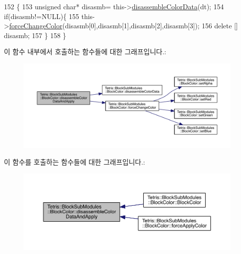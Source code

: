 \begin{DoxyCode}
152                                                               \{
153                 \textcolor{keywordtype}{unsigned} \textcolor{keywordtype}{char}* disasmb= this->\hyperlink{class_tetris_1_1_block_sub_modules_1_1_block_color_a216ddc10773f9d0dc44eca5b8b3d8336}{disassembleColorData}(dt);
154                 \textcolor{keywordflow}{if}(disasmb!=NULL)\{
155                     this->\hyperlink{class_tetris_1_1_block_sub_modules_1_1_block_color_ae6d640629b11d880ca994923657adbe1}{forceChangeColor}(disasmb[0],disasmb[1],disasmb[2],disasmb[3]);
156                     \textcolor{keyword}{delete} [] disasmb;
157                 \}
158             \}
\end{DoxyCode}
이 함수 내부에서 호출하는 함수들에 대한 그래프입니다.\+:
\nopagebreak
\begin{figure}[H]
\begin{center}
\leavevmode
\includegraphics[width=350pt]{de/d44/class_tetris_1_1_block_sub_modules_1_1_block_color_afc3bb979353c91cf992101ed2dde610f_cgraph}
\end{center}
\end{figure}
이 함수를 호출하는 함수들에 대한 그래프입니다.\+:
\nopagebreak
\begin{figure}[H]
\begin{center}
\leavevmode
\includegraphics[width=350pt]{de/d44/class_tetris_1_1_block_sub_modules_1_1_block_color_afc3bb979353c91cf992101ed2dde610f_icgraph}
\end{center}
\end{figure}
\mbox{\label{class_tetris_1_1_block_sub_modules_1_1_block_color_a260b5dd85cdf3145be7564dc2c0ee53d}} 
